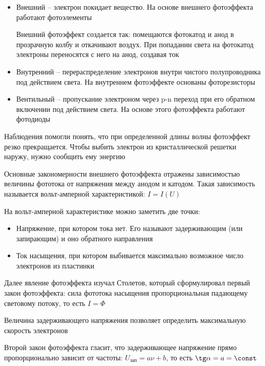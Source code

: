 \begin{itemize}
    \item Внешний -- электрон покидает вещество. На основе внешнего фотоэффекта работают фотоэлементы
    
    Внешний фотоэффект создается так: помещаются фотокатод и анод в прозрачную колбу и откачивают воздух. При попадании света на фотокатод электроны переносятся с него на анод, создавая ток 

    \item Внутренний -- перераспределение электронов внутри чистого полупроводника под действием света. На внутреннем фотоэффекте основаны фоторезисторы

    \item Вентильный -- пропускание электроном через p-n переход при его обратном включении под действием света. На основе этого фотоэффекта работают фотодиоды
\end{itemize}


Наблюдения помогли понять, что при определенной длины волны фотоэффект резко прекращается. Чтобы выбить электрон из кристаллической решетки наружу, нужно сообщить ему энергию

Основные закономерности внешнего фотоэффекта отражены зависимостью величины фототока от напряжения между анодом и катодом. Такая зависимость называется вольт-амперной характеристикой: $I = I(U)$


На вольт-амперной характеристике можно заметить две точки:

\begin{itemize}
    \item Напряжение, при котором тока нет. Его называют задерживающим (или запирающим) и оно обратного направления
    \item Ток насыщения, при котором выбивается максимально возможное число электронов из пластинки
\end{itemize}

\mediumvspace

Далее явление фотоэффекта изучал Столетов, который сформулировал первый закон фотоэффекта: сила фототока насыщения пропорциональная падающему световому потоку, то есть $I = \Phi$

Величина задерживающего напряжения позволяет определить максимальную скорость электронов

Второй закон фотоэффекта гласит, что задерживающее напряжение прямо пропорционально зависит от частоты: $U_\text{зап} = a\nu + b$, то есть $\tg \alpha = a = \const$

